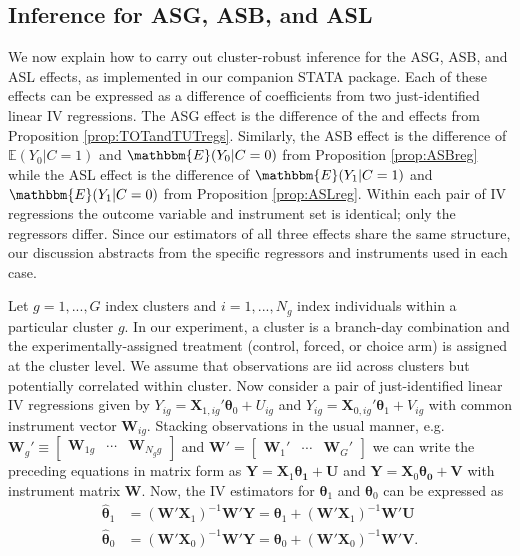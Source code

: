 \begin{appendix}
\normalsize
\normalsize


\subsection{Inference for ASG, ASB, and ASL}
\label{subsec:inference}

We now explain how to carry out cluster-robust inference for the ASG, ASB, and ASL effects, as implemented in our companion STATA package.
Each of these effects can be expressed as a difference of coefficients from two just-identified linear IV regressions.
The ASG effect is the difference of the  and  effects from Proposition \ref{prop:TOTandTUTregs}. 
Similarly, the ASB effect is the difference of $\mathbb{E}(Y_0|C=1)$ and $\mathbbm{E}(Y_0|C=0)$ from Proposition \ref{prop:ASBreg} while the ASL effect is the difference of $\mathbbm{E}(Y_1|C=1)$ and $\mathbbm{E}(Y_1|C=0)$ from Proposition \ref{prop:ASLreg}.
Within each pair of IV regressions the outcome variable and instrument set is identical; only the regressors differ. 
Since our estimators of all three effects share the same structure, our discussion abstracts from the specific regressors and instruments used in each case.

Let $g = 1, ..., G$ index clusters and $i = 1, ..., N_g$ index individuals within a particular cluster $g$. 
In our experiment, a cluster is a branch-day combination and the experimentally-assigned treatment (control, forced, or choice arm) is assigned at the cluster level.
We assume that observations are iid across clusters but potentially correlated within cluster.
Now consider a pair of just-identified linear IV regressions given by
$Y_{ig} = \boldsymbol{X}_{1,ig}' \boldsymbol{\theta}_0 + U_{ig}$ and $Y_{ig} = \boldsymbol{X}_{0,ig}' \boldsymbol{\theta}_1 + V_{ig}$ with common instrument vector $\boldsymbol{W}_{ig}$. 
Stacking observations in the usual manner, e.g.\
$\mathbf{W}_g' \equiv \begin{bmatrix}
\boldsymbol{W}_{1g} & \cdots & 
\boldsymbol{W}_{N_gg} 
\end{bmatrix}$ and 
$\mathbf{W}' = \begin{bmatrix}
\mathbf{W}_1' & \cdots & \mathbf{W}_G'
\end{bmatrix}$
we can write the preceding equations in matrix form as $\mathbf{Y} = \mathbf{X}_1\boldsymbol{\theta_1} + \mathbf{U}$ and $\mathbf{Y} = \mathbf{X}_0\boldsymbol{\theta_0} + \mathbf{V}$ with instrument matrix $\mathbf{W}$.
Now, the IV estimators for $\boldsymbol{\theta}_1$ and $\boldsymbol{\theta}_0$ can be expressed as 
\begin{align*}
\widehat{\boldsymbol{\theta}}_1 
&= \left(\mathbf{W}'\mathbf{X}_1\right)^{-1}\mathbf{W}'\mathbf{Y}  = \boldsymbol{\theta}_1 + \left(\mathbf{W}'\mathbf{X}_1\right)^{-1}\mathbf{W}'\mathbf{U}\\ 
\widehat{\boldsymbol{\theta}}_0 
&= \left(\mathbf{W}'\mathbf{X}_0\right)^{-1}\mathbf{W}'\mathbf{Y} = \boldsymbol{\theta}_0 + \left(\mathbf{W}'\mathbf{X}_0\right)^{-1}\mathbf{W}'\mathbf{V}.
\end{align*}


\end{appendix}
